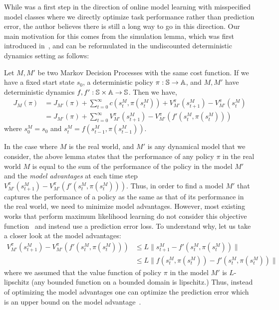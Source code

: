 While \taml{} was a first step in the direction of online model
learning with misspecified model classes where we directly optimize
task performance rather than prediction error, the author believes
there is still a long way to go in this direction. Our main motivation
for this comes from the simulation lemma, which was first introduced
in~\cite{DBLP:journals/ml/KearnsS02}, and can be reformulated in the
undiscounted deterministic dynamics setting as follows:
\begin{lemma}
  Let $M, M'$ be two Markov Decision Processes with the same cost
  function. If we have a fixed 
  start state $s_0$, a deterministic policy $\pi:\mathbb{S}
  \rightarrow \mathbb{A}$, and $M, M'$ have deterministic dynamics
  $f, f': \mathbb{S} \times \mathbb{A} \rightarrow
  \mathbb{S}$. Then we have,
  \begin{align}
    \label{eq:23}
    J_M(\pi) &= J_{M'}(\pi) + \sum_{t=0}^\infty c(s_t^M, \pi(s_t^M)) +
               V_{M'}^\pi(s_{t+1}^M) - V_{M'}^\pi(s_t^M) \\
    &= J_{M'}(\pi) + \sum_{t=0}^\infty V_{M'}^\pi(s_{t+1}^M) -
      V^\pi_{M'}(f'(s_t^M, \pi(s_t^M)))
  \end{align}
  where $s_0^M = s_0$ and $s_t^M = f(s_{t-1}^M, \pi(s_{t-1}^M))$.
\end{lemma}

In the case where $M$ is the real world, and $M'$ is any dynamical
model that we consider, the above lemma states that the performance of
any policy $\pi$ in the real world $M$ is equal to the sum of the performance of the
policy in the model $M'$ and the \textit{model advantages} at each time step $V_{M'}^\pi(s_{t+1}^M) -
      V^\pi_{M'}(f'(s_t^M, \pi(s_t^M)))$. Thus, in order to find a
      model $M'$ that captures the performance of a policy as the same
      as that of its performance in the real world, we need to
      minimize model advantages. However, most existing works that
      perform maximum likelihood learning do not consider this
      objective function~\cite{DBLP:journals/arc/Ljung10,
        DBLP:conf/icml/AbbeelN05, DBLP:conf/icml/RossB12, 
  DBLP:journals/corr/abs-1907-02057} and instead use a prediction
error loss. To understand why, let us take a
closer look at the model advantages:
\begin{align*}
  V_{M'}^\pi(s_{t+1}^M) - V^\pi_{M'}(f'(s_t^M, \pi(s_t^M))) &\leq
                                                              L\|s_{t+1}^M - f'(s_t^M, \pi(s_t^M))\| \\
  &\leq L\|f(s_t^M, \pi(s_t^M)) - f'(s_t^M, \pi(s_t^M))\|
\end{align*}
where we assumed that the value function of policy $\pi$ in the model
$M'$ is $L$-lipschitz (any bounded function on a bounded domain is
lipschitz.) Thus, instead of optimizing the model advantages one can
optimize the prediction error which is an upper bound on the
model advantage~\cite{DBLP:conf/icml/RossB12}.

